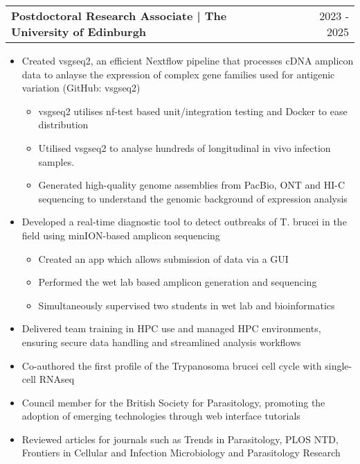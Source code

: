 \documentclass[a4paper,11pt]{article}
\makeatletter
\newenvironment{joblong}[2]{
  \begin{tabularx}{\linewidth}{@{}l X r@{}}
  \textbf{#1} & & #2 \\[2pt]
  \end{tabularx}
  \begin{itemize}[leftmargin=1.2em, itemsep=3pt, label=-]
}{
  \end{itemize}
}
\makeatother
\begin{document}
\begin{joblong}{Postdoctoral Research Associate | The University of Edinburgh}{2023 - 2025}
\item Created vsgseq2, an efficient Nextflow pipeline that processes cDNA amplicon data to anlayse the expression of complex gene families used for antigenic variation (GitHub: vsgseq2)
    \begin{itemize}[leftmargin=2em, itemsep=2pt, label=$\circ$]
        \item vsgseq2 utilises nf-test based unit/integration testing and Docker to ease distribution
        \item Utilised vsgseq2 to analyse hundreds of longitudinal in vivo infection samples.
        \item Generated high-quality genome assemblies from PacBio, ONT and HI-C sequencing to understand the genomic background of expression analysis
    \end{itemize}
\item Developed a real-time diagnostic tool to detect outbreaks of T. brucei in the field using minION-based amplicon sequencing
    \begin{itemize}[leftmargin=2em, itemsep=2pt, label=$\circ$]
        \item Created an app which allows submission of data via a GUI
        \item Performed the wet lab based amplicon generation and sequencing
        \item Simultaneously supervised two students in wet lab and bioinformatics
    \end{itemize}
\item Delivered team training in HPC use and managed HPC environments, ensuring secure data handling and streamlined analysis workflows
\item Co-authored the first profile of the Trypanosoma brucei cell cycle with single-cell RNAseq
\item Council member for the British Society for Parasitology, promoting the adoption of emerging technologies through web interface tutorials
\item Reviewed articles for journals such as Trends in Parasitology, PLOS NTD, Frontiers in Cellular and Infection Microbiology and Parasitology Research
\end{joblong}
\end{document}

